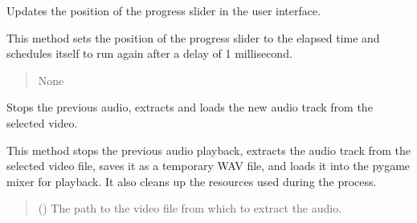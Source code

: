 \documentclass[letterpaper,10pt,english]{sphinxmanual}
\begin{document}
\begin{fulllineitems}

\begin{fulllineitems}
\label{\detokenize{general_interface:general_interface.LecteurVideo.avancer}}
\pysigstartsignatures
{}
\pysigstopsignatures
\sphinxAtStartPar
Updates the position of the progress slider in the user interface.

\sphinxAtStartPar
This method sets the position of the progress slider to the elapsed time and
schedules itself to run again after a delay of 1 millisecond.
\begin{quote}\begin{description}
\sphinxAtStartPar
{} \textendash{} 

\sphinxAtStartPar
None

\sphinxAtStartPar
{} \textendash{} 

\end{description}\end{quote}

\end{fulllineitems}


\begin{fulllineitems}
\label{\detokenize{general_interface:general_interface.LecteurVideo.charger_son_video}}
\pysigstartsignatures
{}
\pysigstopsignatures
\sphinxAtStartPar
Stops the previous audio, extracts and loads the new audio track from the selected video.

\sphinxAtStartPar
This method stops the previous audio playback, extracts the audio track from the
selected video file, saves it as a temporary WAV file, and loads it into the pygame
mixer for playback. It also cleans up the resources used during the process.
\begin{quote}\begin{description}
\sphinxAtStartPar
{} () \textendash{} The path to the video file from which to extract the audio.


\end{description}
\end{quote}
\end{fulllineitems}
\end{fulllineitems}
\end{document}

